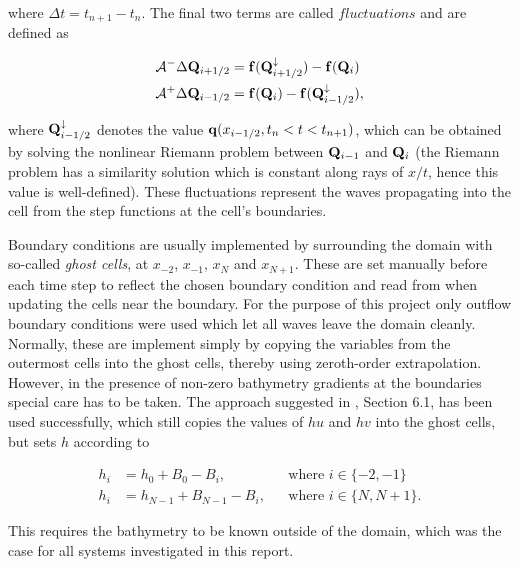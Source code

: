 where $\Delta t = t_{n+1} - t_n$. The final two terms are called $fluctuations$ and are defined as

\begin{subequations}
\label{eq:fluctuations}
\begin{align}
  \mathcal{A}^- \Delta \vb Q_{i+1/2} &= \vb f(\vb Q_{i+1/2}^\downarrow) - \vb f(\vb Q_{i}) \\
  \mathcal{A}^+ \Delta \vb Q_{i-1/2} &= \vb f(\vb Q_{i}) - \vb f(\vb Q_{i-1/2}^\downarrow),
\end{align}
\end{subequations}

where $\vb Q_{i-1/2}^\downarrow$ denotes the value $\vb q(x_{i-1/2}, t_n < t < t_{n+1})$, which can be obtained by solving the nonlinear Riemann problem between $\vb Q_{i-1}$ and $\vb Q_i$ (the Riemann problem has a similarity solution which is constant along rays of $x/t$, hence this value is well-defined). These fluctuations represent the waves propagating into the cell from the step functions at the cell's boundaries.

Boundary conditions are usually implemented by surrounding the domain with so-called \emph{ghost cells}, at $x_{-2}$, $x_{-1}$, $x_N$ and $x_{N+1}$. These are set manually before each time step to reflect the chosen boundary condition and read from when updating the cells near the boundary. For the purpose of this project only outflow boundary conditions were used which let all waves leave the domain cleanly. Normally, these are implement simply by copying the variables from the outermost cells into the ghost cells, thereby using zeroth-order extrapolation. However, in the presence of non-zero bathymetry gradients at the boundaries special care has to be taken. The approach suggested in \citet{leveque1998balancing}, Section 6.1, has been used successfully, which still copies the values of $hu$ and $hv$ into the ghost cells, but sets $h$ according to

\begin{subequations}
  \label{eq:bcs}
  \begin{align}
    h_i &= h_0 + B_0 - B_i, &&\mbox{where $i \in \{-2, -1\}$} \\
    h_i &= h_{N-1} + B_{N-1} - B_i, &&\mbox{where $i \in \{N, N+1\}$}.
  \end{align}
\end{subequations}

This requires the bathymetry to be known outside of the domain, which was the case for all systems investigated in this report.

